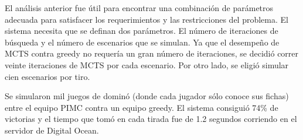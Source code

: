 El análisis anterior fue útil para encontrar una combinación de parámetros adecuada para 
satisfacer los requerimientos y las restricciones del problema. El sistema necesita que se 
definan dos parámetros. El número de iteraciones de búsqueda y el número de escenarios 
que se simulan. Ya que el desempeño de MCTS contra greedy no requería un gran número 
de iteraciones, se decidió correr veinte iteraciones de MCTS por cada escenario. Por otro 
lado, se eligió simular cien escenarios por tiro.

Se simularon mil juegos de dominó (donde cada jugador sólo conoce sus fichas) entre el 
equipo PIMC contra un equipo greedy. El sistema consiguió 74\% de victorias y el tiempo 
que tomó en cada tirada fue de 1.2 segundos corriendo en el servidor de Digital Ocean.